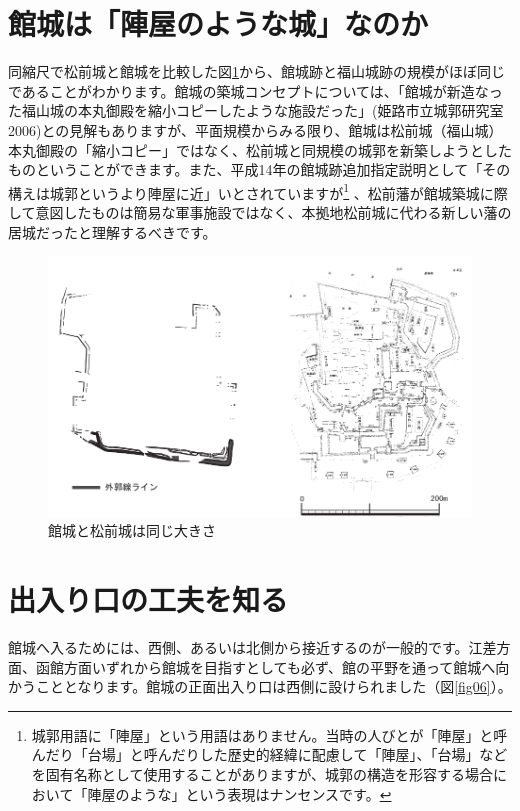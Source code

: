 \documentclass[11pt,report]{jsbook}
\begin{document}
\section{館城は「陣屋のような城」なのか}
同縮尺で松前城と館城を比較した図\ref{fig05}から、館城跡と福山城跡の規模がほぼ同じであることがわかります。館城の築城コンセプトについては、「館城が新造なった福山城の本丸御殿を縮小コピーしたような施設だった」(姫路市立城郭研究室2006)との見解もありますが、平面規模からみる限り、館城は松前城（福山城）本丸御殿の「縮小コピー」ではなく、松前城と同規模の城郭を新築しようとしたものということができます。また、平成14年の館城跡追加指定説明として「その構えは城郭というより陣屋に近」いとされていますが\footnote{
城郭用語に「陣屋」という用語はありません。当時の人びとが「陣屋」と呼んだり「台場」と呼んだりした歴史的経緯に配慮して「陣屋」、「台場」などを固有名称として使用することがありますが、城郭の構造を形容する場合において「陣屋のような」という表現はナンセンスです。
}
、松前藩が館城築城に際して意図したものは簡易な軍事施設ではなく、本拠地松前城に代わる新しい藩の居城だったと理解するべきです。

\begin{figure}[h]
\centering
\includegraphics[width=160truemm]{fig/05.pdf}
\caption{館城と松前城は同じ大きさ}
\label{fig05}
\end{figure}

\section{出入り口の工夫を知る}
館城へ入るためには、西側、あるいは北側から接近するのが一般的です。江差方面、函館方面いずれから館城を目指すとしても必ず、館の平野を通って館城へ向かうこととなります。館城の正面出入り口は西側に設けられました（図\ref{fig06}）。
\end{document}
